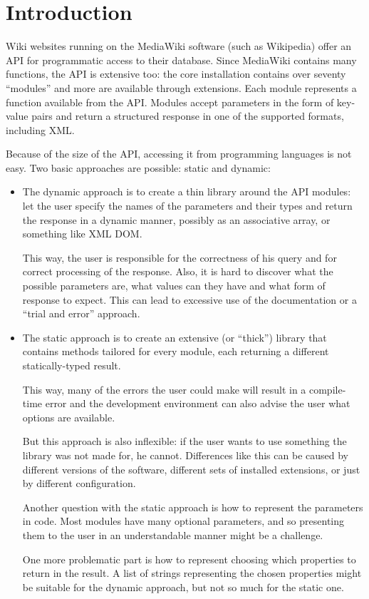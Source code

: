 \chapter*{Introduction}

Wiki websites running on the MediaWiki software (such as Wikipedia) offer an \ac{API}
for programmatic access to their database.
Since MediaWiki contains many functions, the \acs{API} is extensive too:
the core installation contains over seventy “modules” and more are available through extensions.
Each module represents a function available from the \acs{API}.
Modules accept parameters in the form of key-value pairs
and return a structured response in one of the supported formats, including \acs{XML}.

Because of the size of the API, accessing it from programming languages is not easy.
Two basic approaches are possible: static and dynamic:

\begin{itemize}
\item The dynamic approach is to create a thin library around the API modules:
let the user specify the names of the parameters and their types and return the response
in a dynamic manner, possibly as an associative array, or something like \acs{XML} \ac{DOM}.

This way, the user is responsible for the correctness of his query and for correct processing
of the response.
Also, it is hard to discover what the possible parameters are, what values can they have
and what form of response to expect.
This can lead to excessive use of the documentation or a “trial and error” approach.

\item The static approach is to create an extensive (or “thick”) library that contains methods tailored for every module,
each returning a different statically-typed result.

This way, many of the errors the user could make will result in a compile-time error
and the development environment can also advise the user what options are available.

But this approach is also inflexible: if the user wants to use something the library
was not made for, he cannot.
Differences like this can be caused by different versions of the software,
different sets of installed extensions, or just by different configuration.

Another question with the static approach is how to represent the parameters in code.
Most modules have many optional parameters, and so presenting them to the user
in an understandable manner might be a challenge.

One more problematic part is how to represent choosing which properties to return in the result.
A list of strings representing the chosen properties might be suitable for the dynamic approach, but not so much for the static one.
\end{itemize}

